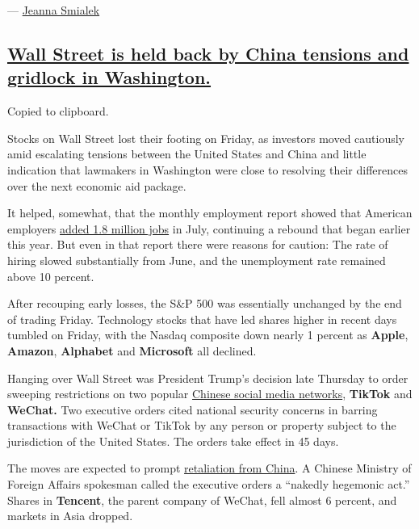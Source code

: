 --- \href{https://www.nytimes3xbfgragh.onion/by/jeanna-smialek}{Jeanna
Smialek}

\hypertarget{wall-street-is-held-back-by-china-tensions-and-gridlock-in-washington}{%
\subsection{\texorpdfstring{\protect\hyperlink{wall-street-is-held-back-by-china-tensions-and-gridlock-in-washington}{Wall
Street is held back by China tensions and gridlock in
Washington.}}{Wall Street is held back by China tensions and gridlock in Washington.}}\label{wall-street-is-held-back-by-china-tensions-and-gridlock-in-washington}}

Copied to clipboard.

Stocks on Wall Street lost their footing on Friday, as investors moved
cautiously amid escalating tensions between the United States and China
and little indication that lawmakers in Washington were close to
resolving their differences over the next economic aid package.

It helped, somewhat, that the monthly employment report showed that
American employers
\href{https://www.nytimes3xbfgragh.onion/live/2020/08/07/business/stock-market-today-coronavirus/us-employers-added-1-8-million-jobs-in-july-despite-a-coronavirus-surge}{added
1.8 million jobs} in July, continuing a rebound that began earlier this
year. But even in that report there were reasons for caution: The rate
of hiring slowed substantially from June, and the unemployment rate
remained above 10 percent.

After recouping early losses, the S\&P 500 was essentially unchanged by
the end of trading Friday. Technology stocks that have led shares higher
in recent days tumbled on Friday, with the Nasdaq composite down nearly
1 percent as \textbf{Apple}, \textbf{Amazon}, \textbf{Alphabet} and
\textbf{Microsoft} all declined.

Hanging over Wall Street was President Trump's decision late Thursday to
order sweeping restrictions on two popular
\href{https://www.nytimes3xbfgragh.onion/2020/08/06/technology/trump-wechat-tiktok-china.html}{Chinese
social media networks}, \textbf{TikTok} and \textbf{WeChat.} Two
executive orders cited national security concerns in barring
transactions with WeChat or TikTok by any person or property subject to
the jurisdiction of the United States. The orders take effect in 45
days.

The moves are expected to prompt
\href{https://www.nytimes3xbfgragh.onion/2020/08/07/business/trump-china-wechat-tiktok.html}{retaliation
from China}. A Chinese Ministry of Foreign Affairs spokesman called the
executive orders a ``nakedly hegemonic act.'' Shares in
\textbf{Tencent}, the parent company of WeChat, fell almost 6 percent,
and markets in Asia dropped.

